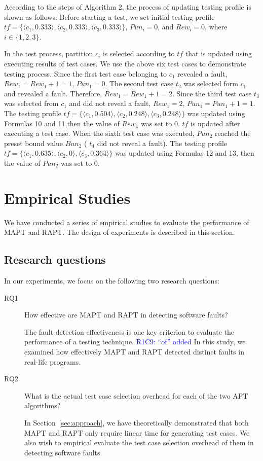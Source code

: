 \documentclass[10pt,journal,compsoc]{IEEEtran}
\begin{document}
According to the steps of Algorithm 2, the process of updating testing profile is shown as follows: Before starting a test, we set initial testing profile $tf = \{\langle c_1, 0.333 \rangle,\langle c_2, 0.333 \rangle, \langle c_3, 0.333 \rangle\}$, $Pun_i = 0$, and $Rew_i = 0$, where $i \in \{1, 2, 3\}$.

In the test process, partition $c_i$ is selected according to $tf$ that is updated using executing results of test cases. We use the above six test cases to demonstrate testing process. Since the first test case belonging to $c_1$ revealed a fault, $Rew_1 = Rew_1 + 1 = 1$, $Pun_1 = 0$. The second test case $t_2$ was selected form $c_1$ and revealed a fault. Therefore, $Rew_1 = Rew_1 + 1 = 2$. Since the third test case $t_3$ was selected from $c_1$ and did not reveal a fault, $Rew_1 = 2$, $Pun_1 = Pun_1 + 1 = 1$. The testing profile $tf = \{\langle c_1, 0.504 \rangle,\langle c_2, 0.248 \rangle, \langle c_3, 0.248 \rangle\}$ was updated using Formulas 10 and 11,then the value of $Rew_1$ was set to 0. $tf$ is updated after executing a test case. When the sixth test case was executed, $Pun_2$ reached the preset bound value $Bun_2$ ( $t_4$ did not reveal a fault). The testing profile $tf = \{\langle c_1, 0.635 \rangle,\langle c_2, 0 \rangle, \langle c_3, 0.364 \rangle\}$ was updated using Formulas 12 and 13, then the value of $Pun_2$ was set to 0.


\section{Empirical Studies}
\label{sec:exp}

We have conducted a series of empirical studies to evaluate the performance of MAPT and RAPT. The design of experiments is described in this section.

\subsection{Research questions}

In our experiments, we focus on the following two research questions:

\begin{description}
\item [RQ1] How effective are MAPT and RAPT in detecting software faults?

The fault-detection effectiveness is one key criterion to evaluate the performance of a testing technique. \textcolor{blue}{R1C9: ``of'' added} In this study, we examined how effectively MAPT and RAPT detected distinct faults in real-life programs.
\item [RQ2] What is the actual test case selection overhead for each of the two APT algorithms?

In Section~\ref{sec:approach}, we have theoretically demonstrated that both MAPT and RAPT only require linear time for generating test cases. We also wish to empirical evaluate the test case selection overhead of them in detecting software faults.
\end{description}
\end{document}
